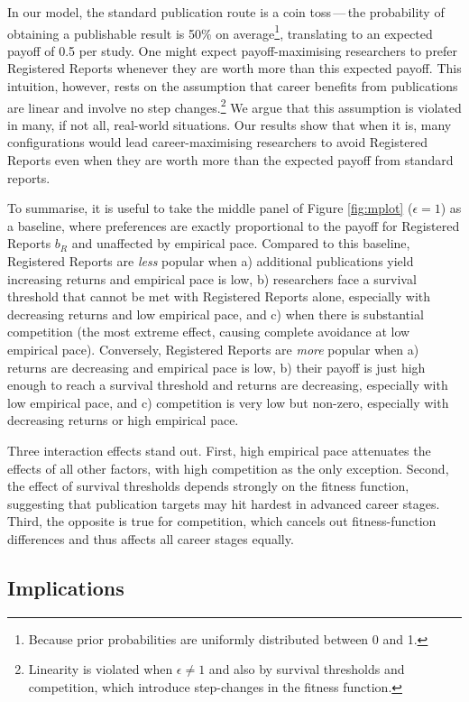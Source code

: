 \documentclass[
  british,
  a4paper,
  ,man,mask,floatsintext]{apa6}
\begin{document}
In our model, the standard publication route is a coin toss\(\,\)---\(\,\)the probability of obtaining a publishable result is 50\% on average\footnote{Because prior probabilities are uniformly distributed between 0 and 1.}, translating to an expected payoff of 0.5 per study.
One might expect payoff-maximising researchers to prefer Registered Reports whenever they are worth more than this expected payoff.
This intuition, however, rests on the assumption that career benefits from publications are linear and involve no step changes.\footnote{Linearity is violated when \(\epsilon \neq 1\) and also by survival thresholds and competition, which introduce step-changes in the fitness function.}
We argue that this assumption is violated in many, if not all, real-world situations.
Our results show that when it is, many configurations would lead career-maximising researchers to avoid Registered Reports even when they are worth more than the expected payoff from standard reports.

To summarise, it is useful to take the middle panel of Figure \ref{fig:mplot} (\(\epsilon = 1\)) as a baseline, where preferences are exactly proportional to the payoff for Registered Reports \(b_{R}\) and unaffected by empirical pace.
Compared to this baseline, Registered Reports are \emph{less} popular when a) additional publications yield increasing returns and empirical pace is low, b) researchers face a survival threshold that cannot be met with Registered Reports alone, especially with decreasing returns and low empirical pace, and c) when there is substantial competition (the most extreme effect, causing complete avoidance at low empirical pace).
Conversely, Registered Reports are \emph{more} popular when a) returns are decreasing and empirical pace is low, b) their payoff is just high enough to reach a survival threshold and returns are decreasing, especially with low empirical pace, and c) competition is very low but non-zero, especially with decreasing returns or high empirical pace.

Three interaction effects stand out.
First, high empirical pace attenuates the effects of all other factors, with high competition as the only exception.
Second, the effect of survival thresholds depends strongly on the fitness function, suggesting that publication targets may hit hardest in advanced career stages.
Third, the opposite is true for competition, which cancels out fitness-function differences and thus affects all career stages equally.

\subsection{Implications}\label{implications}
\end{document}
